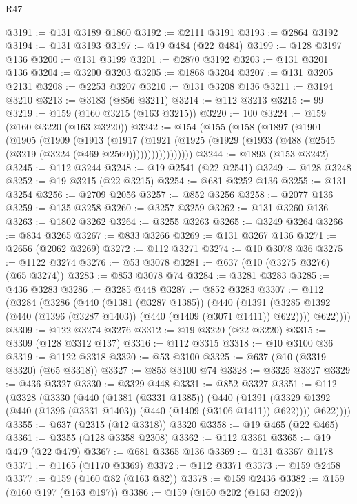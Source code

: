 \begin{lexlean}{R47}
\begin{coremodule}
@3191 := @131 @3189 @1860
@3192 := @2111 @3191
@3193 := @2864 @3192
@3194 := @131 @3193
@3197 := @19 @484 (@22 @484)
@3199 := @128 @3197 @136
@3200 := @131 @3199
@3201 := @2870 @3192
@3203 := @131 @3201 @136
@3204 := @3200 @3203
@3205 := @1868 @3204
@3207 := @131 @3205 @2131
@3208 := @2253 @3207
@3210 := @131 @3208 @136
@3211 := @3194 @3210
@3213 := @3183 (@856 @3211)
@3214 := @112 @3213
@3215 := 99
@3219 := @159 (@160 @3215 (@163 @3215))
@3220 := 100
@3224 := @159 (@160 @3220 (@163 @3220))
@3242 := @154
    (@155
      (@158
        (@1897
          (@1901
            (@1905
              (@1909
                (@1913
                  (@1917
                    (@1921
                      (@1925 (@1929 (@1933 (@488 (@2545 (@3219 (@3224 (@469 @2560)))))))))))))))))
@3244 := @1893 (@153 @3242)
@3245 := @112 @3244
@3248 := @19 @2541 (@22 @2541)
@3249 := @128 @3248
@3252 := @19 @3215 (@22 @3215)
@3254 := @681 @3252 @136
@3255 := @131 @3254
@3256 := @2709 @2056
@3257 := @852 @3256
@3258 := @2077 @136
@3259 := @135 @3258
@3260 := @3257 @3259
@3262 := @131 @3260 @136
@3263 := @1802 @3262
@3264 := @3255 @3263
@3265 := @3249 @3264
@3266 := @834 @3265
@3267 := @833 @3266
@3269 := @131 @3267 @136
@3271 := @2656 (@2062 @3269)
@3272 := @112 @3271
@3274 := @10 @3078 @36
@3275 := @1122 @3274
@3276 := @53 @3078
@3281 := @637 (@10 (@3275 @3276) (@65 @3274))
@3283 := @853 @3078 @74
@3284 := @3281 @3283
@3285 := @436 @3283
@3286 := @3285 @448
@3287 := @852 @3283
@3307 := @112
    (@3284
      (@3286
        (@440
          (@1381 (@3287 @1385))
          (@440
            (@1391 (@3285 @1392 (@440 (@1396 (@3287 @1403)) (@440 (@1409 (@3071 @1411)) @622))))
            @622))))
@3309 := @122 @3274 @3276
@3312 := @19 @3220 (@22 @3220)
@3315 := @3309 (@128 @3312 @137)
@3316 := @112 @3315
@3318 := @10 @3100 @36
@3319 := @1122 @3318
@3320 := @53 @3100
@3325 := @637 (@10 (@3319 @3320) (@65 @3318))
@3327 := @853 @3100 @74
@3328 := @3325 @3327
@3329 := @436 @3327
@3330 := @3329 @448
@3331 := @852 @3327
@3351 := @112
    (@3328
      (@3330
        (@440
          (@1381 (@3331 @1385))
          (@440
            (@1391 (@3329 @1392 (@440 (@1396 (@3331 @1403)) (@440 (@1409 (@3106 @1411)) @622))))
            @622))))
@3355 := @637 (@2315 (@12 @3318)) @3320
@3358 := @19 @465 (@22 @465)
@3361 := @3355 (@128 @3358 @2308)
@3362 := @112 @3361
@3365 := @19 @479 (@22 @479)
@3367 := @681 @3365 @136
@3369 := @131 @3367 @1178
@3371 := @1165 (@1170 @3369)
@3372 := @112 @3371
@3373 := @159 @2458
@3377 := @159 (@160 @82 (@163 @82))
@3378 := @159 @2436
@3382 := @159 (@160 @197 (@163 @197))
@3386 := @159 (@160 @202 (@163 @202))

\end{coremodule}
\end{lexlean}
